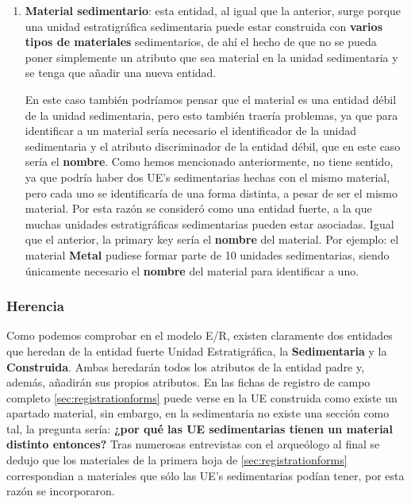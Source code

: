 \begin{enumerate}
        \item \textbf{Material sedimentario}: esta entidad, al igual que la anterior, surge
        porque una unidad estratigráfica sedimentaria puede estar construida con 
        \textbf{varios tipos de materiales} sedimentarios, de ahí el hecho de que no se pueda
        poner simplemente un atributo que sea material en la unidad sedimentaria y se tenga que
        añadir una nueva entidad.

        En este caso también podríamos pensar que el material es una entidad débil de la unidad
        sedimentaria, pero esto también traería problemas, ya que para identificar a un material
        sería necesario el identificador de la unidad sedimentaria y el atributo discriminador
        de la entidad débil, que en este caso sería el \textbf{nombre}. Como hemos mencionado
        anteriormente, no tiene sentido, ya que podría haber dos UE's sedimentarias hechas
        con el mismo material, pero cada uno se identificaría de una forma distinta, a pesar
        de ser el mismo material. Por esta razón se consideró como una entidad fuerte, a la
        que muchas unidades estratigráficas sedimentarias pueden estar asociadas. Igual que el
        anterior, la primary key sería el \textbf{nombre} del material. Por ejemplo: el
        material \textbf{Metal} pudiese formar parte de 10 unidades sedimentarias, siendo
        únicamente necesario el \textbf{nombre} del material para identificar a uno. 
    \end{enumerate}

    \subsubsection{Herencia}
    Como podemos comprobar en el modelo E/R, existen claramente dos entidades que heredan de
    la entidad fuerte Unidad Estratigráfica, la \textbf{Sedimentaria} y la \textbf{Construida}.
    Ambas heredarán todos los atributos de la entidad padre y, además, añadirán sus propios
    atributos. En las fichas de registro de campo completo \ref{sec:registrationforms} puede
    verse en la UE construida como existe un apartado material, sin embargo, en la sedimentaria
    no existe una sección como tal, la pregunta sería: \textbf{¿por qué las UE sedimentarias
    tienen un material distinto entonces?} Tras numerosas entrevistas con el arqueólogo al
    final se dedujo que los materiales de la primera hoja de \ref{sec:registrationforms}
    correspondian a materiales que sólo las UE's sedimentarias podían tener, por esta razón
    se incorporaron.

